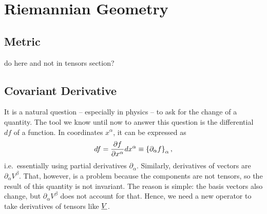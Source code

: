 \documentclass[../relativity_main.tex]{subfiles}
\begin{document}
\newpage



	\section{Riemannian Geometry}
		\subsection{Metric}
do here and not in tensors section?


		\subsection{Covariant Derivative}
It is a natural question -- especially in physics -- to ask for the change of a quantity. The tool we know until now to answer this question is the differential $df$ of a function. In coordinates $x^\alpha$, it can be expressed as
\begin{equation*}
df = \pdv{f}{x^\alpha} dx^\alpha \equiv \qty{\partial_\alpha f}_\alpha \, ,
\end{equation*}
i.e.~essentially using partial derivatives $\partial_\alpha$. Similarly, derivatives of vectors are $\partial_\alpha V^\beta$. That, however, is a problem because the components are not tensors, so the result of this quantity is not invariant. The reason is simple: the basis vectors also change, but $\partial_\alpha V^\beta$ does not account for that. Hence, we need a new operator to take derivatives of tensors like $\underline{V}$.
\end{document}
